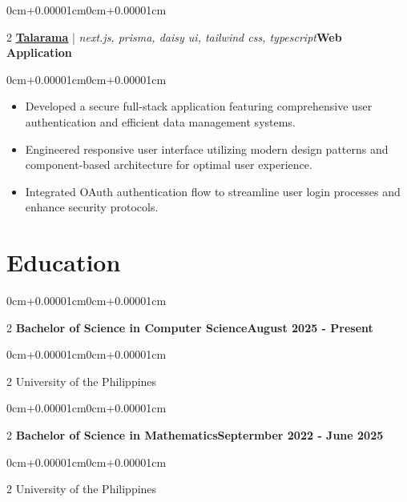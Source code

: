 \documentclass[11pt, letterpaper]{article}
\newenvironment{highlights}{\begin{itemize}[topsep=0.08cm,parsep=0.08cm,partopsep=0pt,itemsep=0pt,leftmargin=0cm+10pt]}{\end{itemize}}
\newenvironment{onecolentry}{\begin{adjustwidth}{0cm+0.00001cm}{0cm+0.00001cm}}{\end{adjustwidth}}
\newenvironment{twocolentry}[2][]{\onecolentry\def\secondColumn{#2}\setcolumnwidth{\fill,5.2cm}\begin{paracol}{2}}{\switchcolumn \raggedleft \secondColumn\end{paracol}\endonecolentry}
\let\hrefWithoutArrow\href
\begin{document}
    \vspace{0.15cm}
    \begin{twocolentry}{\textbf{Web Application}}
        \textbf{\textcolor{blue}{\underline{\hrefWithoutArrow{https://github.com/jlescarlan11/talarama}{Talarama}}}} | \textit{next.js, prisma, daisy ui, tailwind css, typescript}\end{twocolentry}
    \vspace{0.10cm}
    \begin{onecolentry}
        \begin{highlights}
            \item Developed a secure full-stack application featuring comprehensive user authentication and efficient data management systems.
            \item Engineered responsive user interface utilizing modern design patterns and component-based architecture for optimal user experience.
            \item Integrated OAuth authentication flow to streamline user login processes and enhance security protocols.
        \end{highlights}
    \end{onecolentry}
    \vspace{0.15cm}

\section{Education}

    \begin{twocolentry}{\textbf{August 2025 - Present}}
    \textbf{Bachelor of Science in Computer Science}\end{twocolentry}
    \vspace{0.05cm}
    \begin{twocolentry}{}
    University of the Philippines\end{twocolentry}
    \vspace{0.15cm}

    \begin{twocolentry}{\textbf{Septermber 2022 - June 2025}}
    \textbf{Bachelor of Science in Mathematics}\end{twocolentry}
    \vspace{0.05cm}
    \begin{twocolentry}{}
    University of the Philippines\end{twocolentry}
    \vspace{0.15cm}
\end{document}
